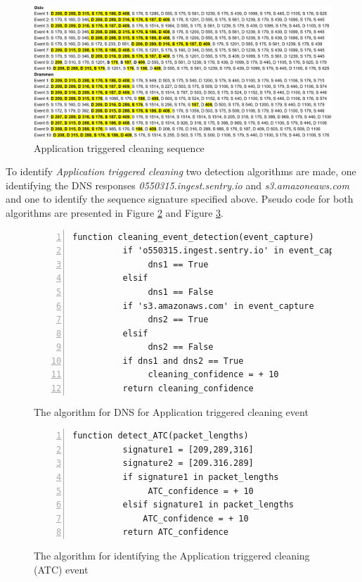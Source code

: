 \begin{figure}[H]
    \centering
    \includegraphics[width=\textwidth]{figures/Sequence_ATC.png}
    \caption{Application triggered cleaning sequence}
    \label{fig:ATCseq}
\end{figure}

To identify \textit{Application triggered cleaning} two detection algorithms are made, one identifying the DNS responses \textit{0550315.ingest.sentry.io} and \textit{s3.amazoneaws.com} and one to identify the sequence signature specified above. Pseudo code for both algorithms are presented in Figure \ref{fig:pseudocodeATCDNS} and Figure \ref{fig:Sudo_code_ATC}.

\begin{figure}[H]
    \centering
    \begin{lstlisting}[numbers=left]
     function cleaning_event_detection(event_capture)
          if 'o550315.ingest.sentry.io' in event_capture
               dns1 == True
          elsif
               dns1 == False
          if 's3.amazonaws.com' in event_capture
               dns2 == True
          elsif
               dns2 == False
          if dns1 and dns2 == True      
               cleaning_confidence = + 10
          return cleaning_confidence
    \end{lstlisting}
    \caption{The algorithm for DNS for Application triggered cleaning event}
    \label{fig:pseudocodeATCDNS}
\end{figure}

\begin{figure}[H]
    \centering
    \begin{lstlisting}[numbers=left]
     function detect_ATC(packet_lengths)
          signature1 = [209,289,316]
          signature2 = [209.316.289]
          if signature1 in packet_lengths
               ATC_confidence = + 10
          elsif signature1 in packet_lengths
              ATC_confidence = + 10
          return ATC_confidence
    \end{lstlisting}
    \caption{The algorithm for identifying the Application triggered cleaning (ATC) event}
    \label{fig:Sudo_code_ATC}
\end{figure}

